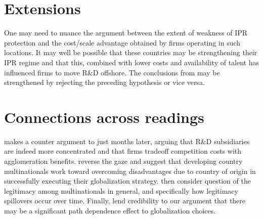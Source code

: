 \documentclass[12pt]{article}
\begin{document}
\section{Extensions}
One  may need to nuance the argument between the extent of weakness of IPR protection and the cost/scale advantage obtained by firms operating in such locations. It may well be possible that these countries may be strengthening their IPR regime and that this, combined with lower costs and availability of talent has influenced firms to move R\&D offshore. The conclusions from \cite{Zhao2006} may be strengthened by rejecting the preceding hypothesis or vice versa. 

\section{Connections across readings}
\cite{Alcacer2006} makes a counter argument to \cite{Zhao2006} just months later, arguing that R\&D subsidiaries are indeed more concentrated and that firms tradeoff competition costs with agglomeration benefits. \cite{Pant2012} reverse the gaze and suggest that developing country multinationals work toward overcoming disadvantages due to country of origin in successfully executing their globalization strategy. \cite{Kostova1999} then consider question of the legitimacy among multinationals in general, and specifically how legitimacy spillovers occur over time. Finally, \cite{Chang2001} lend credibility to our argument that there may be a significant path dependence effect to globalization choices.

 

\end{document}
